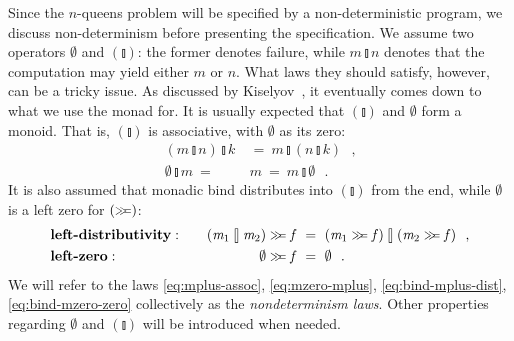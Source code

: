 \documentclass{llncs}
\newcommand{\Varid}[1]{\mathit{#1}}
\let\Varid\mathit
\begin{document}
Since the \ensuremath{\Varid{n}}-queens problem will be specified by a non-deterministic program,
we discuss non-determinism before presenting the specification.
We assume two operators \ensuremath{\emptyset} and \ensuremath{(\talloblong)}: the former denotes failure, while \ensuremath{\Varid{m}\mathbin{\talloblong}\Varid{n}} denotes that the computation may yield either \ensuremath{\Varid{m}} or \ensuremath{\Varid{n}}. What laws they should satisfy, however, can be a tricky issue. As discussed by Kiselyov~\cite{Kiselyov:15:Laws}, it eventually comes down to what we use the monad for. It is usually expected that \ensuremath{(\talloblong)} and \ensuremath{\emptyset} form a monoid. That is, \ensuremath{(\talloblong)} is associative, with \ensuremath{\emptyset} as its zero:
\begin{align}
\ensuremath{(\Varid{m}\mathbin{\talloblong}\Varid{n})\mathbin{\talloblong}\Varid{k}}~ &=~ \ensuremath{\Varid{m}\mathbin{\talloblong}(\Varid{n}\mathbin{\talloblong}\Varid{k})} \mbox{~~,}
  \label{eq:mplus-assoc}\\
\ensuremath{\emptyset\mathbin{\talloblong}\Varid{m}} ~=~ & \ensuremath{\Varid{m}} ~=~ \ensuremath{\Varid{m}\mathbin{\talloblong}\emptyset} \mbox{~~.}
  \label{eq:mzero-mplus}
\end{align}
It is also assumed that monadic bind distributes into \ensuremath{(\talloblong)} from the end,
while \ensuremath{\emptyset} is a left zero for \ensuremath{(\mathrel{\hstretch{0.7}{>\!\!>\!\!=}})}:
\begin{alignat}{2}
  &\mbox{\bf left-distributivity}:\quad &
  \ensuremath{(\Varid{m}_{1}\mathbin{\talloblong}\Varid{m}_{2})\mathrel{\hstretch{0.7}{>\!\!>\!\!=}}\Varid{f}} ~&=~ \ensuremath{(\Varid{m}_{1}\mathrel{\hstretch{0.7}{>\!\!>\!\!=}}\Varid{f})\mathbin{\talloblong}(\Varid{m}_{2}\mathrel{\hstretch{0.7}{>\!\!>\!\!=}}\Varid{f})} \mbox{~~,}
  \label{eq:bind-mplus-dist}\\
  &\mbox{\bf left-zero}:\quad &
  \ensuremath{\emptyset\mathrel{\hstretch{0.7}{>\!\!>\!\!=}}\Varid{f}} ~&=~ \ensuremath{\emptyset} \label{eq:bind-mzero-zero} \mbox{~~.}
\end{alignat}
We will refer to the laws \eqref{eq:mplus-assoc}, \eqref{eq:mzero-mplus},
\eqref{eq:bind-mplus-dist}, \eqref{eq:bind-mzero-zero} collectively as the
\emph{nondeterminism laws}.
Other properties regarding \ensuremath{\emptyset} and \ensuremath{(\talloblong)} will be introduced when needed.
\end{document}

